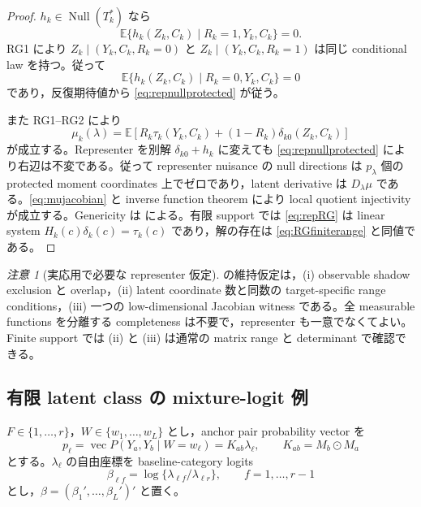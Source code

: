 \documentclass[11pt,a4paper]{ltjsarticle}
\theoremstyle{remark}
\newtheorem{remark}{注意}[section]
\newcommand{\E}{\mathbb E}
\newcommand{\Null}{\operatorname{Null}}
\begin{document}
\begin{proof}
$h_k\in\Null(T_k^*)$ なら
\[
\E\{h_k(Z_k,C_k)\mid R_k=1,Y_k,C_k\}=0.
\]
RG1 により $Z_k\mid(Y_k,C_k,R_k=0)$ と $Z_k\mid(Y_k,C_k,R_k=1)$ は同じ conditional law を持つ。従って
\[
\E\{h_k(Z_k,C_k)\mid R_k=0,Y_k,C_k\}=0
\]
であり，反復期待値から \eqref{eq:repnullprotected} が従う。

また RG1--RG2 により
\begin{equation}
\mu_k(\lambda)
=\E\left[R_k\tau_k(Y_k,C_k)
+(1-R_k)\delta_{k0}(Z_k,C_k)\right]
\label{eq:repprotectedidentity}
\end{equation}
が成立する。Representer を別解 $\delta_{k0}+h_k$ に変えても \eqref{eq:repnullprotected} により右辺は不変である。従って representer nuisance の null directions は $p_\lambda$ 個の protected moment coordinates 上でゼロであり，latent derivative は $D_\lambda\mu$ である。\eqref{eq:mujacobian} と inverse function theorem により local quotient injectivity が成立する。Genericity は  による。有限 support では \eqref{eq:repRG} は linear system $H_k(c)\delta_k(c)=\tau_k(c)$ であり，解の存在は \eqref{eq:RGfiniterange} と同値である。
\end{proof}

\begin{remark}[実応用で必要な representer 仮定]\label{rem:appgeneric}
の維持仮定は，(i) observable shadow exclusion と overlap，(ii) latent coordinate 数と同数の target-specific range conditions，(iii) 一つの low-dimensional Jacobian witness である。全 measurable functions を分離する completeness は不要で，representer も一意でなくてよい。Finite support では (ii) と (iii) は通常の matrix range と determinant で確認できる。
\end{remark}

\subsection{有限 latent class の mixture-logit 例}
$F\in\{1,\ldots,r\}$，$W\in\{w_1,\ldots,w_L\}$ とし，anchor pair probability vector を
\[
p_\ell=\operatorname{vec}P(Y_a,Y_b\mid W=w_\ell)
=K_{ab}\lambda_\ell,
\qquad
K_{ab}=M_b\odot M_a
\]
とする。$\lambda_\ell$ の自由座標を baseline-category logits
\[
\beta_{\ell f}=\log\{\lambda_{\ell f}/\lambda_{\ell r}\},
\qquad f=1,\ldots,r-1
\]
とし，$\beta=(\beta_1',\ldots,\beta_L')'$ と置く。
\end{document}
